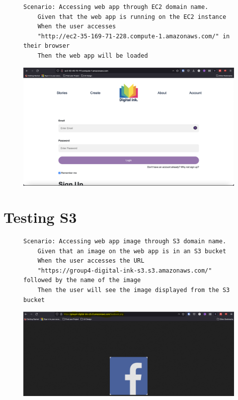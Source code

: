\clearpage
\begin{figure}[!htbp]
    \centering
    \begin{verbatim}
Scenario: Accessing web app through EC2 domain name.
    Given that the web app is running on the EC2 instance
    When the user accesses
    "http://ec2-35-169-71-228.compute-1.amazonaws.com/" in their browser
    Then the web app will be loaded
    \end{verbatim}
    \label{fig:accessing-web-app-ec2}
\end{figure}

\begin{figure}[!htbp]
    \centering
    \includegraphics[width=\textwidth]{resources/ec2/digital-ink-ec2}
    \label{fig:ec2-test-digital-ink}
\end{figure}

\clearpage
\section{Testing S3}\label{sec:testing-s3}
\begin{figure}[!htbp]
    \centering
    \begin{verbatim}
Scenario: Accessing web app image through S3 domain name.
    Given that an image on the web app is in an S3 bucket
    When the user accesses the URL
    "https://group4-digital-ink-s3.s3.amazonaws.com/" followed by the name of the image
    Then the user will see the image displayed from the S3 bucket
    \end{verbatim}
    \label{fig:accessing-image-s3}
\end{figure}

\begin{figure}[!htbp]
    \centering
    \includegraphics[width=125mm]{resources/s3/s3-image-displayed}
    \label{fig:s3-test-photo}
\end{figure}

